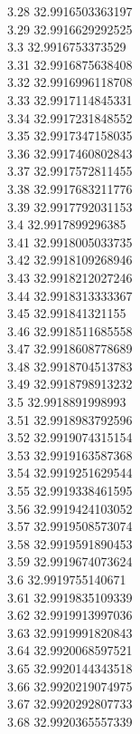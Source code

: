 {3.28	32.9916503363197\\
3.29	32.9916629292525\\
3.3	32.9916753373529\\
3.31	32.9916875638408\\
3.32	32.9916996118708\\
3.33	32.9917114845331\\
3.34	32.9917231848552\\
3.35	32.9917347158035\\
3.36	32.9917460802843\\
3.37	32.9917572811455\\
3.38	32.9917683211776\\
3.39	32.9917792031153\\
3.4	32.9917899296385\\
3.41	32.9918005033735\\
3.42	32.9918109268946\\
3.43	32.9918212027246\\
3.44	32.9918313333367\\
3.45	32.991841321155\\
3.46	32.9918511685558\\
3.47	32.9918608778689\\
3.48	32.9918704513783\\
3.49	32.9918798913232\\
3.5	32.9918891998993\\
3.51	32.9918983792596\\
3.52	32.9919074315154\\
3.53	32.9919163587368\\
3.54	32.9919251629544\\
3.55	32.9919338461595\\
3.56	32.9919424103052\\
3.57	32.9919508573074\\
3.58	32.9919591890453\\
3.59	32.9919674073624\\
3.6	32.9919755140671\\
3.61	32.9919835109339\\
3.62	32.9919913997036\\
3.63	32.9919991820843\\
3.64	32.9920068597521\\
3.65	32.9920144343518\\
3.66	32.9920219074975\\
3.67	32.9920292807733\\
3.68	32.9920365557339\\
}
